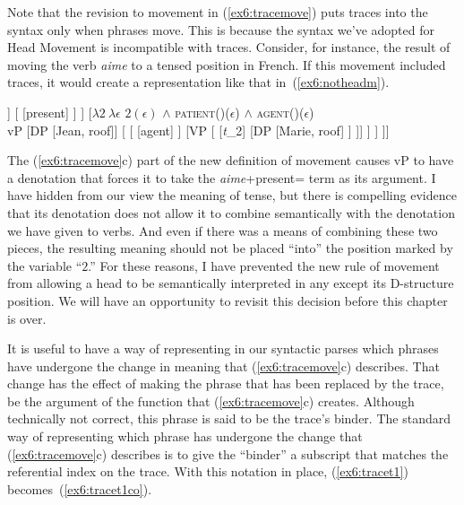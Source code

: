 Note that the revision to movement in (\ref{ex6:tracemove}) puts traces into the syntax only when phrases move. This is because the syntax we've adopted for Head Movement is incompatible with traces. Consider, for instance, the result of moving the verb \emph{aime} to a tensed  position in French. If this movement included traces, it would create a representation like that in~(\ref{ex6:notheadm}).
\begin{exe}
\raggedright
	\ex \label{ex6:notheadm}
	\footnotesize
	\begin{forest}
	[TP [\ibar{T}
		[\obar{T} 
			[\obar{V} [aime] ]
			[ [present] ]
		 ]
		[$\lambda 2\ \lambda \epsilon$ $2(\epsilon)$ $\wedge$ \textsc{patient}()($\epsilon$) $\wedge$ \textsc{agent}()($\epsilon$) \\vP
			[DP [Jean, roof]] 
			[
				[ [agent] ]
				[VP [ 
					[\emph{t}_2]
					[DP [Marie, roof] ]
				]]
			]
		 ]
	]]
	\end{forest}
\end{exe}
The (\ref{ex6:tracemove}c) part of the new definition of movement causes vP to have a denotation that forces it to take the \emph{aime}+present= term as its argument. I have hidden from our view the meaning of tense, but there is compelling evidence that its denotation does not allow it to combine semantically with the denotation we have given to verbs. And even if there was a means of combining these two pieces, the resulting meaning should not be placed ``into'' the position marked by the variable ``$2$.'' For these reasons, I have prevented the new rule of movement from allowing a head to be semantically interpreted in any except its D-structure position. We will have an opportunity to revisit this decision before this chapter is over.

It is useful to have a way of representing in our syntactic parses which phrases have undergone the change in meaning that (\ref{ex6:tracemove}c) describes. That change has the effect of making the phrase that has been replaced by the trace, be the argument of the function that (\ref{ex6:tracemove}c) creates. Although technically not correct, this phrase is said to be the trace's binder. The standard way of representing which phrase has undergone the change that (\ref{ex6:tracemove}c) describes is to give the ``binder'' a subscript that matches the referential index on the trace. With this notation in place, (\ref{ex6:tracet1}) becomes~(\ref{ex6:tracet1co}).%
%
%
%

